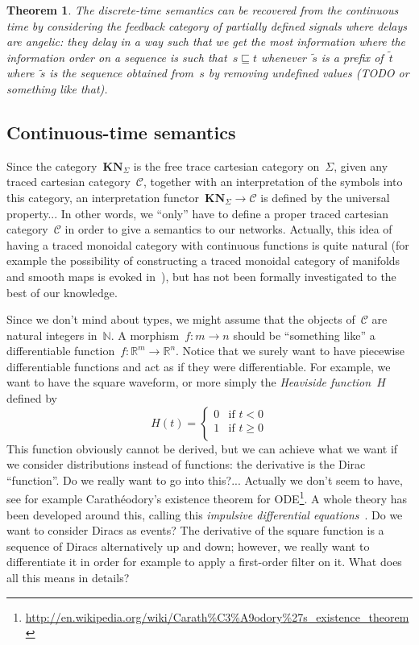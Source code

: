 \documentclass{article}
\newtheorem{theorem}{Theorem}
\newcommand{\N}{\mathbb{N}}
\newcommand{\R}{\mathbb{R}}
\newcommand{\category}[1]{\mathbf{#1}}
\newcommand{\KN}{\category{KN}}
\renewcommand{\C}{\mathcal{C}}
\begin{document}
\begin{theorem}
  The discrete-time semantics can be recovered from the continuous time by
  considering the feedback category of partially defined signals where delays
  are angelic: they delay in a way such that we get the most information where
  the information order on a sequence is such that~$s\sqsubseteq t$
  whenever~$\tilde{s}$ is a prefix of~$\tilde{t}$ where~$\tilde{s}$ is the
  sequence obtained from~$s$ by removing undefined values (TODO or something
  like that).
\end{theorem}

\subsection{Continuous-time semantics}
Since the category~$\KN_\Sigma$ is the free trace cartesian category
on~$\Sigma$, given any traced cartesian category~$\C$, together with an
interpretation of the symbols into this category, an interpretation
functor~$\KN_\Sigma\to\C$ is defined by the universal property... In other
words, we ``only'' have to define a proper traced cartesian category~$\C$ in
order to give a semantics to our networks. Actually, this idea of having a
traced monoidal category with continuous functions is quite natural (for example
the possibility of constructing a traced monoidal category of manifolds and
smooth maps is evoked in~\cite{abramsky1996retracing}), but has not been
formally investigated to the best of our knowledge.

Since we don't mind about types, we might assume that the objects of~$\C$ are
natural integers in~$\N$. A morphism~$f:m\to n$ should be ``something like'' a
differentiable function~$f:\R^m\to\R^n$. Notice that we surely want to have
piecewise differentiable functions and act as if they were differentiable. For
example, we want to have the square waveform, or more simply the \emph{Heaviside
  function}~$H$ defined by
\[
H(t)=
\begin{cases}
  0&\text{if $t<0$}\\
  1&\text{if $t\geq 0$}\\
\end{cases}
\]
This function obviously cannot be derived, but we can achieve what we want if we
consider distributions instead of functions: the derivative is the Dirac
``function''. Do we really want to go into this?... Actually we don't seem to
have, see for example Carathéodory's existence theorem for
ODE\footnote{\url{http://en.wikipedia.org/wiki/Carath\%C3\%A9odory\%27s_existence_theorem}}. A
whole theory has been developed around this, calling this \emph{impulsive
  differential equations}~\cite{lakshmikantham1989theory}. Do we want to
consider Diracs as events? The derivative of the square function is a sequence
of Diracs alternatively up and down; however, we really want to differentiate it
in order for example to apply a first-order filter on it. What does all this
means in details?
\end{document}
